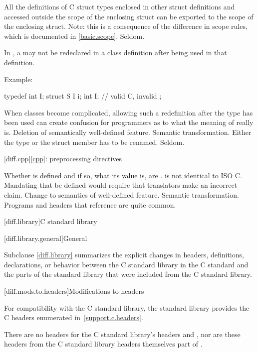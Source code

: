 All the definitions of C struct types enclosed in other struct
definitions and accessed outside the scope of the enclosing
struct can be exported to the scope of the enclosing struct.
Note: this is a consequence of the difference in scope rules,
which is documented in \ref{basic.scope}.
\howwide
Seldom.

\change
In \Cpp{}, a  may not be redeclared in a class definition after being used in that definition.

Example:
\begin{codeblock}
typedef int I;
struct S {
  I i;
  int I;            // valid C, invalid \Cpp{}
};
\end{codeblock}
\rationale
When classes become complicated, allowing such a redefinition
after the type has been used can create confusion for \Cpp{}
programmers as to what the meaning of  really is.
\effect
Deletion of semantically well-defined feature.
\difficulty
Semantic transformation.
Either the type or the struct member has to be renamed.
\howwide
Seldom.

[diff.cpp]{\ref{cpp}: preprocessing directives}

\change
Whether  is defined and if so, what its value is, are
.
\rationale
\Cpp{} is not identical to ISO C\@.
Mandating that 
be defined would require that translators make an incorrect claim.
\effect
Change to semantics of well-defined feature.
\difficulty
Semantic transformation.
\howwide
Programs and headers that reference  are
quite common.

[diff.library]{C standard library}

[diff.library.general]{General}
%

\pnum
Subclause \ref{diff.library} summarizes the explicit changes in headers,
definitions, declarations, or behavior between the C standard library
in the C standard and the parts of the \Cpp{} standard library that were
included from the C standard library.

[diff.mods.to.headers]{Modifications to headers}

\pnum
For compatibility with the C standard library,
the \Cpp{} standard library provides the C headers enumerated
in~\ref{support.c.headers}.

\pnum
There are no \Cpp{} headers for the C standard library's headers
 and ,
nor are these headers from the C standard library headers themselves part of \Cpp{}.

